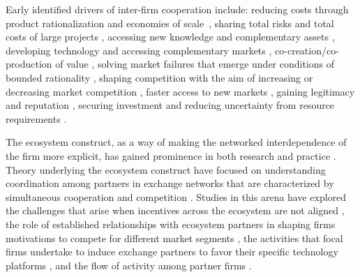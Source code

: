 \documentclass[CHICAGO,Times1COL]{WileyNJDv5} %
\begin{document}
Early identified drivers of inter-firm cooperation include:
reducing costs through product rationalization and economies of scale~\citep{mariti1983co,contractor1992competition}, %
sharing total risks and total costs of large projects \citep{harrigan1984joint,baldi2012options},
accessing new knowledge and complementary assets \citep{kogut1988joint,teece1992competition},
developing  technology and accessing complementary  markets \citep{cravens_et_al_1996},
co-creation/co-production of value \citep{chan1997strategic,ramirez1999value}, %
solving market failures that emerge under conditions of bounded rationality \citep{williamson1985economic,williamson1991comparative},
shaping competition with the aim of increasing or decreasing market competition \citep{fuller_and_porter_1986coalitions,garud_and_kumaraswamy1993changing},
faster access to new markets \citep{contractor_and_lorgange_1988should,hung2003taxonomy},
gaining legitimacy and reputation \citep{dimaggio2000iron,greenwood2008influencing}, %
securing investment \citep{guiso2004role,stam2008entrepreneurial} and reducing uncertainty from resource requirements \citep{pfeffer_and_salancik_2003external}.
 
 The ecosystem construct, as a way of making the networked interdependence of the firm more explicit, has gained prominence in both  research
  and practice \citep{moore1999death,iansiti2004keystone,adner2006match}.
%
%
Theory underlying the ecosystem construct have focused on understanding coordination among partners in exchange
networks that are characterized by simultaneous
cooperation and competition \citep{afuah2000,brandenburger_and_nalebuff2011co}. Studies in this arena have explored the challenges that arise when incentives
across the ecosystem are not aligned \citep{casadesus2007wintel}, the role of established relationships with ecosystem partners in shaping firms motivations to compete for different
market segments \citep{Christensen1995}, the activities that focal firms undertake to induce exchange partners to favor their specific technology platforms \citep{gawer_and_cusunamo2002platform},  and the flow of activity among partner firms \citep{adner2010value}.
\end{document}

